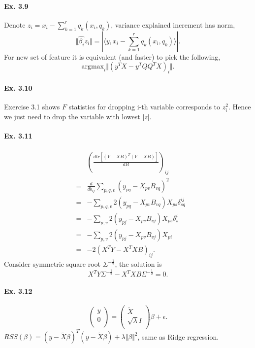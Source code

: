 \paragraph*{Ex. 3.9}
Denote $z_{i} = x_{i} - \sum_{k=1}^r q_{k}( x_{i}, q_{k})$, variance explained increment has norm,
$$\Vert\hat{\beta_{i}}z_{i}\Vert = |\langle y, x_{i} - \sum_{k=1}^r q_{k} (x_{i}, q_{k}) \rangle|.$$
For new set of feature it is equivalent (and faster) to pick the following,
$$\mbox{argmax}_{i}\Vert (y^T X - y^TQQ^{T}X)_{i}\Vert.$$
\paragraph*{Ex. 3.10}
Exercise 3.1 shows $F$ statistics for dropping i-th variable corresponds to $z^2_i$. Hence we just need to drop the variable with lowest $|z|$.

\paragraph*{Ex. 3.11}
\begin{eqnarray*}
    && \left(\frac{d tr[(Y-XB)^{T}(Y-XB)]}{dB}\right)_{ij}\\
    &=& \frac{d}{db_{ij}}\sum_{p,q,v}(y_{pq}-X_{pv}B_{vq})^2\\
    &=& -\sum_{p,q,v}2(y_{pq}-X_{pv}B_{vq})X_{ps}\delta_{sq}^{ij}\\
    &=& -\sum_{p,v}2(y_{pj}-X_{pv}B_{vj})X_{ps}\delta_{s}^{i}\\
    &=& -\sum_{p,v}2(y_{pj}-X_{pv}B_{vj})X_{pi}\\
    &=& -2(X^TY -X^{T}XB)_{ij}.
\end{eqnarray*}
Consider symmetric square root $\Sigma^{-\frac{1}{2}}$, the solution is
$$X^TY\Sigma^{-\frac{1}{2}} -X^{T}XB\Sigma^{-\frac{1}{2}}=0.$$

\paragraph*{Ex. 3.12}

$$
    \left(
    \begin{array}{c}
            y \\
            0 \\
        \end{array}
    \right)
    =
    \left(
    \begin{array}{c}
            \widetilde{X}    \\
            \sqrt{\lambda} I \\
        \end{array}
    \right)
    \beta + \epsilon.
$$
$RSS(\beta)=(y-\tilde{X}\beta)^T(y-\tilde{X}\beta)  + \lambda \Vert\beta\Vert^2$, same as Ridge regression.

